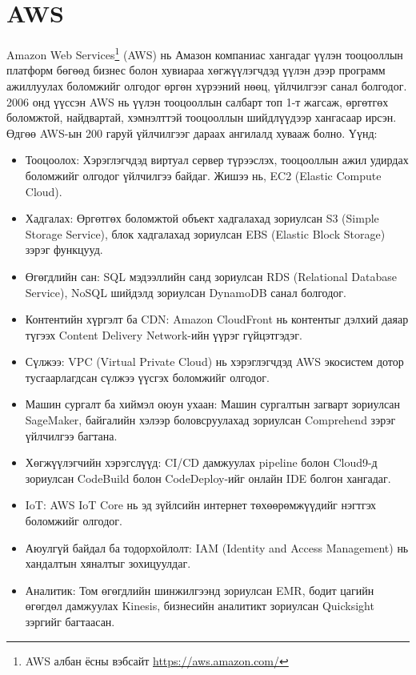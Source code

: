 \section{AWS}
Amazon Web Services\footnote{AWS албан ёсны вэбсайт \url{https://aws.amazon.com/}} (AWS) нь Амазон компаниас хангадаг үүлэн тооцооллын платформ бөгөөд бизнес болон хувиараа хөгжүүлэгчдэд үүлэн дээр программ ажиллуулах боломжийг олгодог өргөн хүрээний нөөц, үйлчилгээг санал болгодог. 2006 онд үүссэн AWS нь үүлэн тооцооллын салбарт топ 1-т жагсаж, өргөтгөх боломжтой, найдвартай, хэмнэлттэй тооцооллын шийдлүүдээр хангасаар ирсэн. Өдгөө AWS-ын 200 гаруй үйлчилгээг дараах ангилалд хувааж болно. Үүнд:
\begin{itemize}
    \item Тооцоолох: Хэрэглэгчдэд виртуал сервер түрээслэх, тооцооллын ажил удирдах боломжийг олгодог үйлчилгээ байдаг. Жишээ нь, EC2 (Elastic Compute Cloud).

    \item Хадгалах: Өргөтгөх боломжтой объект хадгалахад зориулсан S3 (Simple Storage Service), блок хадгалахад зориулсан EBS (Elastic Block Storage) зэрэг функцууд.

    \item Өгөгдлийн сан: SQL мэдээллийн санд зориулсан RDS (Relational Database Service), NoSQL шийдэлд зориулсан DynamoDB санал болгодог.

    \item Контентийн хүргэлт ба CDN: Amazon CloudFront нь контентыг дэлхий даяар түгээх Content Delivery Network-ийн үүрэг гүйцэтгэдэг.

    \item Сүлжээ: VPC (Virtual Private Cloud) нь хэрэглэгчдэд AWS экосистем дотор тусгаарлагдсан сүлжээ үүсгэх боломжийг олгодог.

    \item Машин сургалт ба хиймэл оюун ухаан: Машин сургалтын загварт зориулсан SageMaker, байгалийн хэлээр боловсруулахад зориулсан Comprehend зэрэг үйлчилгээ багтана.

    \item Хөгжүүлэгчийн хэрэгслүүд: CI/CD дамжуулах pipeline болон Cloud9-д зориулсан CodeBuild болон CodeDeploy-ийг онлайн IDE болгон хангадаг.

    \item IoT: AWS IoT Core нь эд зүйлсийн интернет төхөөрөмжүүдийг нэгтгэх боломжийг олгодог.

    \item Аюулгүй байдал ба тодорхойлолт: IAM (Identity and Access Management) нь хандалтын хяналтыг зохицуулдаг.

    \item Аналитик: Том өгөгдлийн шинжилгээнд зориулсан EMR, бодит цагийн өгөгдөл дамжуулах Kinesis, бизнесийн аналитикт зориулсан Quicksight зэргийг багтаасан.
\end{itemize}

